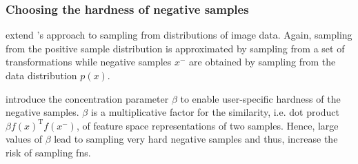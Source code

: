 \subsubsection{Choosing the hardness of negative samples}\label{subsec:choose_hardness}

\citet{robinson_contrastive_2021} 
extend \citet{chuang_debiased_2020}'s approach to sampling from distributions of image data.
Again, sampling from the positive sample distribution is approximated by sampling from a set of transformations
while negative samples $x^-$ are obtained by sampling from the data distribution $p(x)$.

\citet{robinson_contrastive_2021} introduce the concentration parameter $\beta$ 
to enable user-specific hardness of the negative samples.
$\beta$ is a multiplicative factor for the similarity, i.e. dot product $\beta f(x)^\text{T}f(x^-)$, 
of feature space representations of two samples.
Hence, large values of $\beta$ lead to sampling very hard negative samples and thus, 
increase the risk of sampling \acp{fn}.